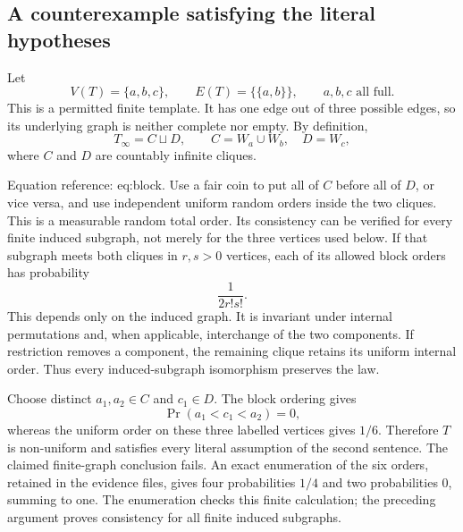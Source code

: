 \documentclass[10pt]{article}
\begin{document}
\subsection*{A counterexample satisfying the literal hypotheses}
Let \[V(T)=\{a,b,c\},\qquad E(T)=\{\{a,b\}\},
 \qquad a,b,c\text{ all full}.\] This is a permitted finite template. It has one edge out of three possible edges, so its underlying graph is neither complete nor empty. By definition, \[T_\infty=C\sqcup D,\qquad C=W_a\cup W_b,\quad D=W_c,\] where \(C\) and \(D\) are countably infinite cliques.\par
Equation reference: eq:block. Use a fair coin to put all of \(C\) before all of \(D\), or vice versa, and use independent uniform random orders inside the two cliques. This is a measurable random total order. Its consistency can be verified for every finite induced subgraph, not merely for the three vertices used below. If that subgraph meets both cliques in \(r,s>0\) vertices, each of its allowed block orders has probability \[\frac{1}{2r!s!}.
 \] This depends only on the induced graph. It is invariant under internal permutations and, when applicable, interchange of the two components. If restriction removes a component, the remaining clique retains its uniform internal order. Thus every induced-subgraph isomorphism preserves the law.\par
Choose distinct \(a_1,a_2\in C\) and \(c_1\in D\). The block ordering gives \[\Pr(a_1<c_1<a_2)=0,\] whereas the uniform order on these three labelled vertices gives \(1/6\). Therefore \(T\) is non-uniform and satisfies every literal assumption of the second sentence. The claimed finite-graph conclusion fails. An exact enumeration of the six orders, retained in the evidence files, gives four probabilities \(1/4\) and two probabilities \(0\), summing to one. The enumeration checks this finite calculation; the preceding argument proves consistency for all finite induced subgraphs.\par
\end{document}
